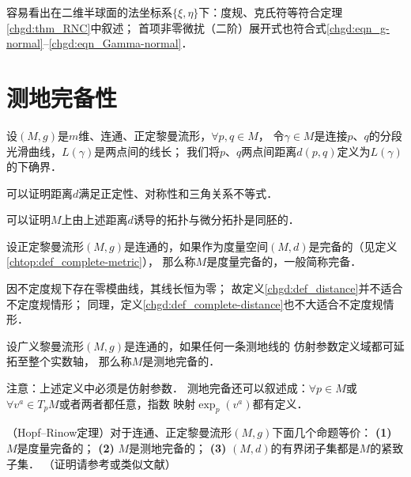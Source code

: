 容易看出在二维半球面的法坐标系$\{\xi,\eta\}$下：度规、克氏符等符合定理\ref{chgd:thm_RNC}中叙述；
首项非零微扰（二阶）展开式也符合式\eqref{chgd:eqn_g-normal}--\eqref{chgd:eqn_Gamma-normal}．





\section{测地完备性}\label{chgd:sec_compelete}
 


\begin{definition}\label{chgd:def_distance}
    设$(M,g)$是$m$维、连通、正定黎曼流形，$\forall p,q \in M$，
    令$\gamma\in M$是连接$p$、$q$的分段光滑曲线，$L(\gamma)$是两点间的线长；
    我们将$p$、$q$两点间{\heiti 距离$d(p,q)$}定义为$L(\gamma)$的下确界．
\end{definition}

可以证明\cite[\S 3.6]{chen-li-2023-2ed-v1}距离$d$满足正定性、对称性和三角关系不等式．

可以证明\cite[\S 3.6]{chen-li-2023-2ed-v1}$M$上由上述距离$d$诱导的拓扑与微分拓扑是同胚的．

\begin{definition}\label{chgd:def_complete-distance}
    设正定黎曼流形$(M,g)$是连通的，如果作为度量空间$(M,d)$是完备的（见定义\ref{chtop:def_complete-metric}），
    那么称$M$是{\heiti 度量完备}的，一般简称{\heiti 完备}．
\end{definition}

因不定度规下存在零模曲线，其线长恒为零；
故定义\eqref{chgd:def_distance}并不适合不定度规情形；
同理，定义\eqref{chgd:def_complete-distance}也不大适合不定度规情形．

\begin{definition}\label{chgd:def_complete-geodesic}
    设广义黎曼流形$(M,g)$是连通的，如果任何一条测地线的
    {\kaishu 仿射参数}定义域都可延拓至整个实数轴，
    那么称$M$是{\heiti 测地完备}的．
\end{definition}
注意：上述定义中必须是{\kaishu 仿射参数}．
测地完备还可以叙述成：$\forall p\in M$或$\forall v^a\in T_p M$或者两者都任意，指数
映射$\exp_{p}(v^a)$都有定义．


\begin{theorem}\label{chgd:thm_Hopf-Rinow}
    （Hopf--Rinow定理）对于连通、正定黎曼流形$(M,g)$下面几个命题等价：
    {\bfseries (1)} $M$是度量完备的；
    {\bfseries (2)} $M$是测地完备的；
    {\bfseries (3)} $(M,d)$的有界闭子集都是$M$的紧致子集．
    （证明请参考\parencite[\S 3.6]{chen-li-2023-2ed-v1}或类似文献）
\end{theorem}


